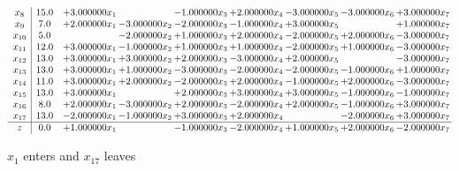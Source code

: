 \documentclass[10pt]{article}
\begin{document}
\[\begin{array}{c| c c@{\hskip 2pt} c@{\hskip 2pt} c@{\hskip 2pt} c@{\hskip 2pt} c@{\hskip 2pt} c@{\hskip 2pt} c@{\hskip 2pt} }
 x_{8}   &  15.0 & + 3.000000 x_{1} &   & -1.000000 x_{3} & + 2.000000 x_{4} & -3.000000 x_{5} & -3.000000 x_{6} & + 3.000000 x_{7}\\
 x_{9}   &  7.0 & + 2.000000 x_{1} & -3.000000 x_{2} & -2.000000 x_{3} & -1.000000 x_{4} & + 3.000000 x_{5} &   & + 1.000000 x_{7}\\
 x_{10}   &  5.0  &   & -2.000000 x_{2} & + 1.000000 x_{3} & + 2.000000 x_{4} & -2.000000 x_{5} & + 2.000000 x_{6} & -3.000000 x_{7}\\
 x_{11}   &  12.0 & + 3.000000 x_{1} & -1.000000 x_{2} & + 1.000000 x_{3} & + 1.000000 x_{4} & -2.000000 x_{5} & + 1.000000 x_{6} & -3.000000 x_{7}\\
 x_{12}   &  13.0 & + 3.000000 x_{1} & + 3.000000 x_{2} & + 2.000000 x_{3} & -3.000000 x_{4} & + 2.000000 x_{5} &   & -3.000000 x_{7}\\
 x_{13}   &  13.0 & + 3.000000 x_{1} & + 1.000000 x_{2} & -3.000000 x_{3} & -2.000000 x_{4} & -2.000000 x_{5} & -1.000000 x_{6} & + 1.000000 x_{7}\\
 x_{14}   &  11.0 & + 3.000000 x_{1} & + 2.000000 x_{2} & -2.000000 x_{3} & + 2.000000 x_{4} & -1.000000 x_{5} & + 2.000000 x_{6} & -3.000000 x_{7}\\
 x_{15}   &  13.0 & + 3.000000 x_{1} &   & + 2.000000 x_{3} & + 3.000000 x_{4} & + 3.000000 x_{5} & -1.000000 x_{6} & -1.000000 x_{7}\\
 x_{16}   &  8.0 & + 2.000000 x_{1} & -3.000000 x_{2} & + 2.000000 x_{3} & -2.000000 x_{4} & + 2.000000 x_{5} & -1.000000 x_{6} & + 3.000000 x_{7}\\
 x_{17}   &  13.0 & -2.000000 x_{1} & -1.000000 x_{2} & + 3.000000 x_{3} & + 2.000000 x_{4} &   & -2.000000 x_{6} & + 3.000000 x_{7}\\
\hline
z    &  0.0 & + 1.000000 x_{1} &   & -1.000000 x_{3} & -2.000000 x_{4} & + 1.000000 x_{5} & + 2.000000 x_{6} & -2.000000 x_{7}\\
\end{array}\]


 $ x_{1} $ enters and $ x_{17} $ leaves 
\end{document}
